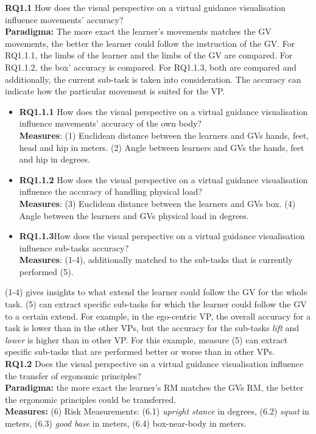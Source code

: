 \textbf{RQ1.1} How does the visual perspective on a virtual guidance visualisation influence movements' accuracy?\\
\textbf{Paradigma:} The more exact the learner's movements matches the GV movements, the better the learner could follow the instruction of the GV. For RQ1.1.1, the limbs of the learner and the limbs of the GV are compared. For RQ1.1.2, the box' accuracy is compared. For RQ1.1.3, both are compared and additionally, the current sub-task is taken into consideration. The accuracy can indicate how the particular movement is suited for the VP.
\begin{itemize}
	\item[] \textbf{RQ1.1.1} How does the visual perspective on a virtual guidance visualisation influence movements' accuracy of the own body?\\
	\textbf{Measures}: (1) Euclidean distance between the learners and GVs hands, feet, head and hip in meters. (2) Angle between learners and GVs the hands, feet and hip in degrees.
	
	\item[] \textbf{RQ1.1.2} How does the visual perspective on a virtual guidance visualisation influence the accuracy of handling physical load?\\
	\textbf{Measures}: (3) Euclidean distance between the learners and GVs box. (4) Angle between the learners and GVs physical load in degrees.
	
	\item[] \textbf{RQ1.1.3}How does the visual perspective on a virtual guidance visualisation influence sub-tasks accuracy?\\
	\textbf{Measures}: (1-4), additionally matched to the sub-tasks that is currently performed (5).
\end{itemize}	
(1-4) gives insights to what extend the learner could follow the GV for the whole task. (5) can extract specific sub-tasks for which the learner could follow the GV to a certain extend. For example, in the ego-centric VP, the overall accuracy for a task is lower than in the other VPs, but the accuracy for the sub-tasks \textit{lift} and \textit{lower} is higher than in other VP. For this example, measure (5) can extract specific sub-tasks that are performed better or worse than in other VPs.\\

\textbf{RQ1.2} Does the visual perspective on a virtual guidance visualisation influence the transfer of ergonomic principles?\\
\textbf{Paradigma:} the more exact the learner's RM matches the GVs RM, the better the ergonomic principles could be transferred.\\
\textbf{Measures:} (6) Risk Measurements: (6.1) \textit{upright stance} in degrees, (6.2) \textit{squat} in meters, (6.3) \textit{good base} in meters, (6.4) box-near-body in meters.\\

